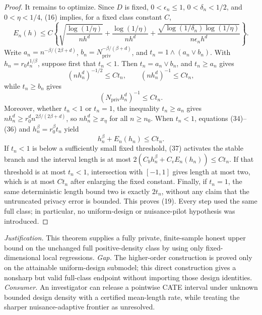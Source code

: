 \documentclass{article}
\begin{document}
\begin{proof}
It remains to optimize.  Since \(D\) is fixed, \(0<\epsilon_n\le1\), \(0<\delta_n<1/2\), and \(0<\eta<1/4\), (16) implies, for a fixed class constant \(C\),
\[
 E_n(h)\le C\left\{
 \sqrt{\frac{\log(1/\eta)}{nh^d}}
 +\frac{\log(1/\eta)}{nh^d}
 +\frac{\sqrt{\log(1/\delta_n)\log(1/\eta)}}
 {n\epsilon_nh^d}\right\}.
\tag{34}
\]
Write \(a_n=n^{-\beta/(2\beta+d)}\), \(b_n=N_{\mathrm{priv}}^{-\beta/(\beta+d)}\), and \(t_n=1\wedge(a_n\vee b_n)\).  With \(h_n=r_0t_n^{1/\beta}\), suppose first that \(t_n<1\).  Then \(t_n=a_n\vee b_n\), and \(t_n\ge a_n\) gives
\[
 (nh_n^d)^{-1/2}\le C t_n,
 \qquad (nh_n^d)^{-1}\le Ct_n,
\tag{35}
\]
while \(t_n\ge b_n\) gives
\[
 (N_{\mathrm{priv}}h_n^d)^{-1}\le Ct_n.
\tag{36}
\]
Moreover, whether \(t_n<1\) or \(t_n=1\), the inequality \(t_n\ge a_n\) gives \(nh_n^d\ge r_0^dn^{2\beta/(2\beta+d)}\), so \(nh_n^d\ge x_\eta\) for all \(n\ge n_0\).  When \(t_n<1\), equations (34)--(36) and \(h_n^\beta=r_0^\beta t_n\) yield
\[
 h_n^\beta+E_n(h_n)\le Ct_n.
\tag{37}
\]
If \(t_n<1\) is below a sufficiently small fixed threshold, (37) activates the stable branch and the interval length is at most \(2(C_bh_n^\beta+C_vE_n(h_n))\le Ct_n\).  If that threshold is at most \(t_n<1\), intersection with \([-1,1]\) gives length at most two, which is at most \(Ct_n\) after enlarging the fixed constant.  Finally, if \(t_n=1\), the same deterministic length bound two is exactly \(2t_n\), without any claim that the untruncated privacy error is bounded.  This proves (19).  Every step used the same full class; in particular, no uniform-design or nuisance-pilot hypothesis was introduced.
\end{proof}
\par\smallskip\noindent \textit{Justification.} This theorem supplies a fully private, finite-sample honest upper bound on the unchanged full positive-density class by using only fixed-dimensional local regressions. \textit{Gap.} The higher-order construction is proved only on the attainable uniform-design submodel; this direct construction gives a nonsharp but valid full-class endpoint without importing those design identities. \textit{Consumer.} An investigator can release a pointwise CATE interval under unknown bounded design density with a certified mean-length rate, while treating the sharper nuisance-adaptive frontier as unresolved.
\end{document}
